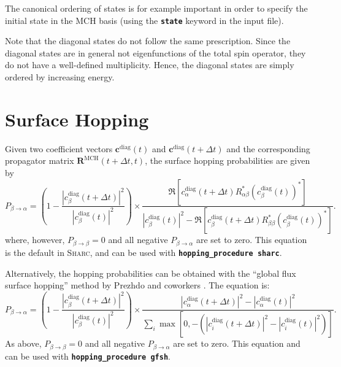 \documentclass[a4paper,10pt,DIV=15,openany,twoside=false]{scrbook}
\newcommand{\sharc}{\textsc{Sharc}}
\newcommand{\ttt}[1]{\textbf{\texttt{#1}}}
\newcommand{\VEC}[1]{\ensuremath{\mathbf{#1}}}
\begin{document}
The canonical ordering of states is for example important in order to specify the initial state in the MCH basis (using the \ttt{state} keyword in the input file).

Note that the diagonal states do not follow the same prescription. Since the diagonal states are in general not eigenfunctions of the total spin operator, they do not have a well-defined multiplicity. 
Hence, the diagonal states are simply ordered by increasing energy.


\section{Surface Hopping}\label{met:hopping}

Given two coefficient vectors $\VEC{c}^{\text{diag}}(t)$ and $\VEC{c}^{\text{diag}}(t+\Delta t)$ and the corresponding propagator matrix $\VEC{R}^{\text{MCH}}(t+\Delta t,t)$, the surface hopping probabilities are given by
\begin{equation}
  P_{\beta\rightarrow\alpha}=
  \left(
    1-
    \frac{
      \left|
        c_\beta^{\text{diag}}(t+\Delta t)
      \right|^2
    }{
      \left|
        c_\beta^{\text{diag}}(t)
      \right|^2
    }\right)
    \times
    \frac{
      \Re\left[
        c^{\text{diag}}_\alpha(t+\Delta t)
        R^*_{\alpha\beta}
        \left(
          c^{\text{diag}}_\beta(t)
        \right)^*
      \right]
    }{
      \left|
        c^{\text{diag}}_\beta(t)
      \right|^2
      -\Re\left[
        c^{\text{diag}}_\beta(t+\Delta t)
        R^*_{\beta\beta}
        \left(
          c^{\text{diag}}_\beta(t)
        \right)^*
      \right]
    }.
\end{equation}
where, however, $P_{\beta\rightarrow\beta}=0$ and all negative $P_{\beta\rightarrow\alpha}$ are set to zero.
This equation is the default in \sharc, and can be used with \ttt{hopping\_procedure sharc}.

Alternatively, the hopping probabilities can be obtained with the ``global flux surface hopping'' method by Prezhdo and coworkers \cite{Prezhdo_todo}.
The equation is:
\begin{equation}
  P_{\beta\rightarrow\alpha}=
  \left(
    1-
    \frac{
      \left|
        c_\beta^{\text{diag}}(t+\Delta t)
      \right|^2
    }{
      \left|
        c_\beta^{\text{diag}}(t)
      \right|^2
    }\right)
    \times
    \frac{
      |c^{\text{diag}}_\alpha(t+\Delta t)|^2-|c^{\text{diag}}_\alpha(t)|^2
    }{
      \sum_{i} \max\left[0,-(|c^{\text{diag}}_i(t+\Delta t)|^2-|c^{\text{diag}}_i(t)|^2)\right]
    }.
\end{equation}
As above, $P_{\beta\rightarrow\beta}=0$ and all negative $P_{\beta\rightarrow\alpha}$ are set to zero.
This equation and can be used with \ttt{hopping\_procedure gfsh}.
\end{document}

